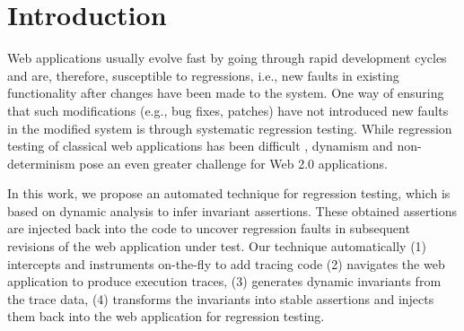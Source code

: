 \section{Introduction}
\label{Sec:intro}
Web applications usually evolve fast by going through rapid development cycles and are, therefore, susceptible to regressions, i.e., new faults in existing functionality after changes have been made to the system. One way of ensuring that such modifications (e.g., bug fixes, patches) have not introduced new faults in the modified system is through systematic regression testing.
While regression testing of classical web applications
has been difficult \cite{tarhini:reg08}, dynamism and non-determinism pose an even greater challenge \cite{Roest:2010.icst} for Web 2.0 applications.


In this work, we propose an automated technique for \javascript regression testing, which is based on dynamic analysis to infer invariant assertions. These obtained assertions are injected back into the \javascript code to uncover regression faults in subsequent revisions of the web application under test. 
Our technique automatically (1) intercepts and instruments \javascript on-the-fly to add tracing code (2) navigates the web application to produce execution traces, (3) generates dynamic invariants from the trace data, (4) transforms the invariants into stable assertions and injects them back into the web application for regression testing.

